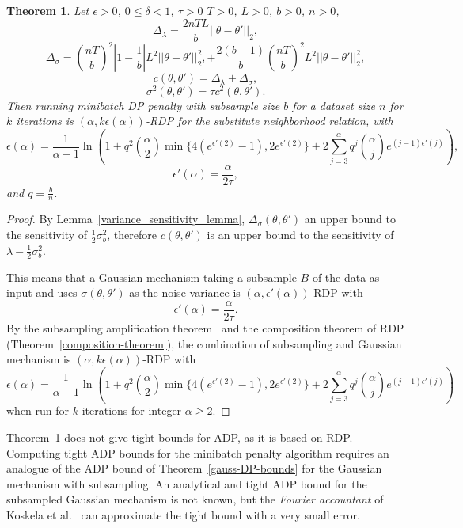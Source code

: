 \documentclass[english,twoside,openright]{HYgraduMLDS}
\newtheorem{theorem}{Theorem}
\begin{document}
\begin{theorem}\label{dp_penalty_minibatch_theorem}
  Let \(\epsilon > 0\), \(0 \leq \delta < 1\), \(\tau > 0\) \(T > 0\),
  \(L > 0\), \(b > 0\), \(n > 0\),
  \[
    \Delta_\lambda = \frac{2nTL}{b}||\theta - \theta'||_2,
  \]
  \[
    \Delta_\sigma = \left(\frac{nT}{b}\right)^2 \left|1 - \frac{1}{b}\right|
    L^2||\theta - \theta'||_2^2,
    + \frac{2(b - 1)}{b}\left(\frac{nT}{b}\right)^2 L^2||\theta - \theta'||^2_2,
  \]
  \[
    c(\theta, \theta') = \Delta_\lambda + \Delta_\sigma,
  \]
  \[
    \sigma^2(\theta, \theta') = \tau c^2(\theta, \theta').
  \]
  Then running minibatch DP penalty with subsample size \(b\) for a dataset
  size \(n\) for \(k\) iterations
  is \((\alpha, k\epsilon(\alpha))\)-RDP for the substitute neighborhood
  relation, with
  \[
    \epsilon(\alpha) = \frac{1}{\alpha - 1}\ln \left(
      1 + q^2\binom{\alpha}{2}\min\{4(e^{\epsilon'(2)} - 1), 2e^{\epsilon'(2)}\}
      + 2 \sum_{j=3}^\alpha q^j\binom{\alpha}{j}e^{(j-1)\epsilon'(j)}\right),
  \]
  \[
    \epsilon'(\alpha) = \frac{\alpha}{2\tau},
  \]
  and \(q = \frac{b}{n}\).
\end{theorem}
\begin{proof}
    By Lemma~\ref{variance_sensitivity_lemma}, 
    \(\Delta_\sigma(\theta, \theta')\) an upper 
    bound to the sensitivity of \(\frac{1}{2}\sigma_b^2\), therefore 
    \(c(\theta, \theta')\) is an upper bound to the sensitivity of 
    \(\lambda - \frac{1}{2}\sigma_b^2\).

    This means that a Gaussian mechanism taking a subsample \(B\) of the data as 
    input and uses \(\sigma(\theta, \theta')\) as the noise variance 
    is \((\alpha, \epsilon'(\alpha))\)-RDP with 
    \[
        \epsilon'(\alpha) = \frac{\alpha}{2\tau}.
    \]
    By the subsampling amplification theorem~\cite[Theorem 9]{WangBK19} and 
    the composition theorem of RDP (Theorem~\ref{composition-theorem}),
    the combination of subsampling and Gaussian mechanism is 
    \((\alpha, k\epsilon(\alpha))\)-RDP with 
    \[
        \epsilon(\alpha) = \frac{1}{\alpha - 1}\ln \left(
        1 + q^2\binom{\alpha}{2}\min\{4(e^{\epsilon'(2)} - 1), 2e^{\epsilon'(2)}\}
        + 2 \sum_{j=3}^\alpha q^j\binom{\alpha}{j}e^{(j-1)\epsilon'(j)}\right)
    \]
    when run for \(k\) iterations for integer \(\alpha \geq 2\).
\end{proof}

Theorem~\ref{dp_penalty_minibatch_theorem} does not give tight bounds for ADP,
as it is based on RDP. Computing tight ADP bounds for the minibatch penalty
algorithm requires an analogue of the ADP bound of Theorem~\ref{gauss-DP-bounds}
for the Gaussian mechanism with subsampling. An analytical and tight ADP bound for
the subsampled Gaussian mechanism is not known, but the \emph{Fourier accountant}
of Koskela et al.~\cite{KJH20} can approximate the tight bound with a very small
error.
\end{document}

